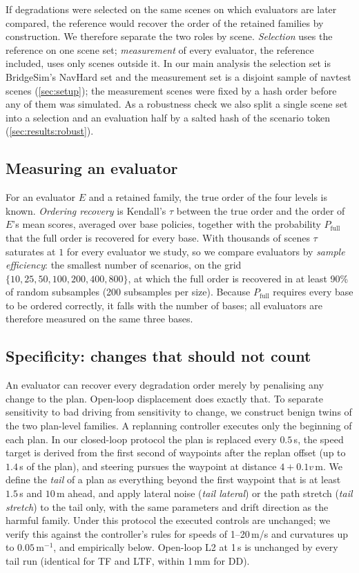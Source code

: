If degradations were selected on the same scenes on which evaluators are later compared, the
reference would recover the order of the retained families by construction.
We therefore separate the two roles by scene.
\emph{Selection} uses the reference on one scene set; \emph{measurement} of every evaluator, the
reference included, uses only scenes outside it.
In our main analysis the selection set is BridgeSim's NavHard set and the measurement set is a
disjoint sample of navtest scenes (\cref{sec:setup}); the measurement scenes were fixed by a hash
order before any of them was simulated.
As a robustness check we also split a single scene set into a selection and an evaluation half by a
salted hash of the scenario token (\cref{sec:results:robust}).

\subsection{Measuring an evaluator}
\label{sec:method:metrics}
For an evaluator $E$ and a retained family, the true order of the four levels is known.
\emph{Ordering recovery} is Kendall's $\tau$ between the true order and the order of $E$'s mean
scores, averaged over base policies, together with the probability $P_\text{full}$ that the full
order is recovered for every base.
With thousands of scenes $\tau$ saturates at $1$ for every evaluator we study, so we compare
evaluators by \emph{sample efficiency}: the smallest number of scenarios, on the grid
$\{10,25,50,100,200,400,800\}$, at which the full order is recovered in at least 90\% of random
subsamples (200 subsamples per size).
Because $P_\text{full}$ requires every base to be ordered correctly, it falls with the number of bases;
all evaluators are therefore measured on the same three bases.

\subsection{Specificity: changes that should not count}
\label{sec:method:spec}
An evaluator can recover every degradation order merely by penalising any change to the plan.
Open-loop displacement does exactly that.
To separate sensitivity to bad driving from sensitivity to change, we construct benign twins of the
two plan-level families.
A replanning controller executes only the beginning of each plan.
In our closed-loop protocol the plan is replaced every $0.5$\,s, the speed target is derived from the
first second of waypoints after the replan offset (up to $1.4$\,s of the plan), and steering pursues
the waypoint at distance $4+0.1v$\,m.
We define the \emph{tail} of a plan as everything beyond the first waypoint that is at least $1.5$\,s
and $10$\,m ahead, and apply lateral noise (\emph{tail lateral}) or the path stretch (\emph{tail
stretch}) to the tail only, with the same parameters and drift direction as the harmful family.
Under this protocol the executed controls are unchanged; we verify this against the controller's
rules for speeds of 1--20\,m/s and curvatures up to $0.05$\,m$^{-1}$, and empirically below.
Open-loop L2 at 1\,s is unchanged by every tail run (identical for TF and LTF, within 1\,mm for DD).

